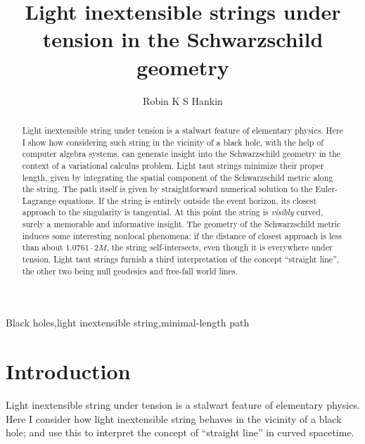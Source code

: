 \documentclass[review]{elsarticle}
\begin{document}
\begin{frontmatter}
\title{Light inextensible strings under tension in the Schwarzschild geometry}
\author{Robin K S Hankin}
\address{Auckland University of Technology}


\begin{abstract}

Light inextensible string under tension is a stalwart feature of
elementary physics.  Here I show how considering such string in the
vicinity of a black hole, with the help of computer algebra systems,
can generate insight into the Schwarzschild geometry in the context of
a variational calculus problem.  Light taut strings minimize their
proper length, given by integrating the spatial component of the
Schwarzschild metric along the string.  The path itself is given by
straightforward numerical solution to the Euler-Lagrange equations.
If the string is entirely outside the event horizon, its closest
approach to the singularity is tangential.  At this point the string
is {\em visibly} curved, surely a memorable and informative insight.
The geometry of the Schwarzschild metric induces some interesting
nonlocal phenomena: if the distance of closest approach is less than
about $1.0761\cdot 2M$, the string self-intersects, even though it is
everywhere under tension.  Light taut strings furnish a third
interpretation of the concept ``straight line'', the other two being
null geodesics and free-fall world lines.


\end{abstract}

\begin{keyword}
Black holes\sep light inextensible string\sep minimal-length path
\end{keyword}

\end{frontmatter}
\newcommand{\rmd}{\mathrm{d}}

\linenumbers
\section{Introduction}

Light inextensible string under tension is a stalwart feature of
elementary physics.  Here I consider how light inextensible string
behaves in the vicinity of a black hole; and use this to interpret the
concept of ``straight line'' in curved spacetime.
\end{document}

